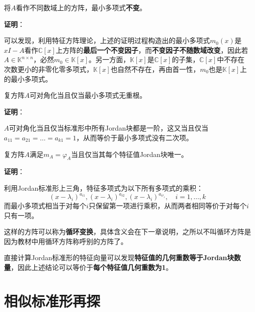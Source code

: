 \documentclass[a4paper,UTF8,fontset=windows,AutoFakeBold]{ctexart}
\newcommand*{\note}{\noindent *}
\newcommand{\proo}[1]{{\vspace{5pt}\kaishu\noindent\textbf{证明}：\vspace{-3pt}
\begin{compactitem}
    \item[] #1
\end{compactitem}
}}
\begin{document}
\begin{compactitem}
    \item 将$A$看作不同数域上的方阵，最小多项式\textbf{不变}。
    
    \proo{
        可以发现，利用特征方阵理论，上述的证明过程构造出的最小多项式$m_0(x)$是$xI-A$看作$\mathbb{C}[x]$上方阵的\textbf{最后一个不变因子}，而\textbf{不变因子不随数域改变}，因此若$A\in\mathbb{K}^{n\times n}$，必然$m_0\in\mathbb{K}[x]$。另一方面，$\mathbb{K}[x]$是$\mathbb{C}[x]$的子集，$\mathbb{C}[x]$中不存在次数更小的非零化零多项式，$\mathbb{K}[x]$也自然不存在，再由首一性，$m_0$也是$\mathbb{K}[x]$上的最小多项式。
    }
    
    \item 复方阵$A$可对角化当且仅当最小多项式无重根。
    
    \proo{
        $A$可对角化当且仅当标准形中所有Jordan块都是一阶，这又当且仅当$a_{11}=a_{21}=\dots=a_{k1}=1$，从而等价于最小多项式没有二次项。
    }

    \item 复方阵$A$满足$m_A=\varphi_A$当且仅当其每个特征值Jordan块唯一。
    
    \proo{
        利用Jordan标准形上三角，特征多项式为以下所有多项式的乘积：
        $$(x-\lambda_i)^{a_{i1}},(x-\lambda_i)^{a_{i2}},(x-\lambda_i)^{a_{ir_i}},\quad i=1,\dots,k$$
        而最小多项式相当于对每个$i$只保留第一项进行乘积，从而两者相同等价于对每个$i$只有一项。
    }
    
    \note 这样的方阵可以称为\textbf{循环变换}，具体含义会在下一章说明，之所以不叫循环方阵是因为教材中用循环方阵称呼别的方阵了。

    \note 直接计算Jordan标准形的特征向量可以发现\textbf{特征值的几何重数等于Jordan块数量}，因此上述结论可以等价于\textbf{每个特征值几何重数为1}。
\end{compactitem}

\section{相似标准形再探}
\end{document}
